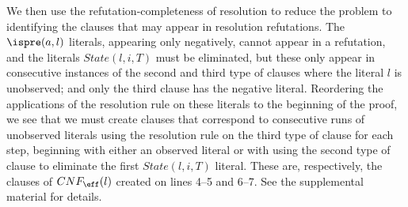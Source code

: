 We then use the refutation-completeness of resolution to reduce the problem to identifying the clauses that may appear in resolution refutations. The $\ispre(a,l)$ literals, appearing only negatively, cannot appear in a refutation, and the literals $State(l,i,T)$ must be eliminated, but these only appear in consecutive instances of the second and third type of clauses where the literal $l$ is unobserved; and only the third clause has the negative literal. Reordering the applications of the resolution rule on these literals to the beginning of the proof, we see that we must create clauses that correspond to consecutive runs of unobserved literals using the resolution rule on the third type of clause for each step, beginning with either an observed literal or with using the second type of clause to eliminate the first $State(l,i,T)$ literal. These are, respectively, the clauses of $CNF_{\eff}(l)$ created on lines 4--5 and 6--7. See the supplemental material for details. 
